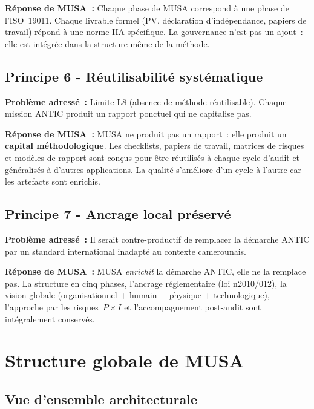 \documentclass[12pt,a4paper,oneside]{report}
\begin{document}
\textbf{R\'eponse de MUSA~:} Chaque phase de MUSA correspond \`a une phase de
l'ISO~19011. Chaque livrable formel (PV, d\'eclaration d'ind\'ependance, papiers
de travail) r\'epond \`a une norme IIA sp\'ecifique. La gouvernance n'est pas un
ajout~: elle est int\'egr\'ee dans la structure m\^eme de la m\'ethode.

\subsection{Principe 6 - R\'eutilisabilit\'e syst\'ematique}

\textbf{Probl\`eme adress\'e~:} Limite L8 (absence de m\'ethode r\'eutilisable).
Chaque mission ANTIC produit un rapport ponctuel qui ne capitalise pas.

\textbf{R\'eponse de MUSA~:} MUSA ne produit pas un rapport~: elle produit un
\textbf{capital m\'ethodologique}. Les checklists, papiers de travail, matrices de
risques et mod\`eles de rapport sont con\c{c}us pour \^etre r\'eutilis\'es \`a
chaque cycle d'audit et g\'en\'eralis\'es \`a d'autres applications. La qualit\'e
s'am\'eliore d'un cycle \`a l'autre car les artefacts sont enrichis.

\subsection{Principe 7 - Ancrage local pr\'eserv\'e}

\textbf{Probl\`eme adress\'e~:} Il serait contre-productif de remplacer la
d\'emarche ANTIC par un standard international inadapt\'e au contexte camerounais.

\textbf{R\'eponse de MUSA~:} MUSA \textit{enrichit} la d\'emarche ANTIC, elle ne la
remplace pas. La structure en cinq phases, l'ancrage r\'eglementaire (loi
n\textdegree{}2010/012), la vision globale (organisationnel + humain + physique +
technologique), l'approche par les risques~$P \times I$ et l'accompagnement
post-audit sont int\'egralement conserv\'es.

\section{Structure globale de MUSA}
\label{sec:structure}

\subsection{Vue d'ensemble architecturale}
\end{document}

